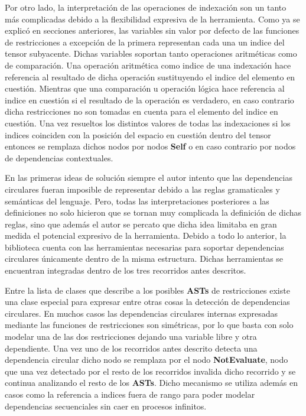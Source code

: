 Por otro lado, la interpretación de las operaciones de indexación son un tanto más complicadas debido a la flexibilidad expresiva de
la herramienta. Como ya se explicó en secciones anteriores, las variables sin valor por defecto de las funciones de restricciones a
excepción de la primera representan cada una un indice del tensor subyacente. Dichas variables soportan tanto operaciones aritméticas
como de comparación. Una operación aritmética como indice de una indexación hace referencia al resultado de dicha operación sustituyendo
el indice del elemento en cuestión. Mientras que una comparación u operación lógica hace referencia al indice en cuestión si el resultado
de la operación es verdadero, en caso contrario dicha restricciones no son tomadas en cuenta para el elemento del indice en cuestión.
Una vez resueltos los distintos valores de todas las indexaciones si los indices coinciden con la posición del espacio en cuestión dentro
del tensor entonces se remplaza dichos nodos por nodos {\bf Self} o en caso contrario por nodos de dependencias contextuales.

En las primeras ideas de solución siempre el autor intento que las dependencias circulares fueran imposible de representar debido a
las reglas gramaticales y semánticas del lenguaje. Pero, todas las interpretaciones posteriores a las definiciones no solo hicieron
que se tornan muy complicada la definición de dichas reglas, sino que además el autor se percato que dicha idea limitaba en gran
medida el potencial expresivo de la herramienta. Debido a todo lo anterior, la biblioteca cuenta con las herramientas necesarias para
soportar dependencias circulares únicamente dentro de la misma estructura. Dichas herramientas se encuentran integradas dentro de los
tres recorridos antes descritos.

Entre la lista de clases que describe a los posibles {\bf ASTs} de restricciones existe una clase especial para expresar entre otras cosas
la detección de dependencias circulares. En muchos casos las dependencias circulares internas expresadas mediante las
funciones de restricciones son simétricas, por lo que basta con solo modelar una de las dos restricciones dejando una variable libre
y otra dependiente. Una vez uno de los recorridos antes descrito detecta una dependencia circular dicho nodo se remplaza por el nodo {\bf NotEvaluate},
nodo que una vez detectado por el resto de los recorridos invalida dicho recorrido y se continua analizando el resto de los {\bf ASTs}.
Dicho mecanismo se utiliza además en casos como la referencia a indices fuera de rango para poder modelar dependencias secuenciales
sin caer en procesos infinitos.


